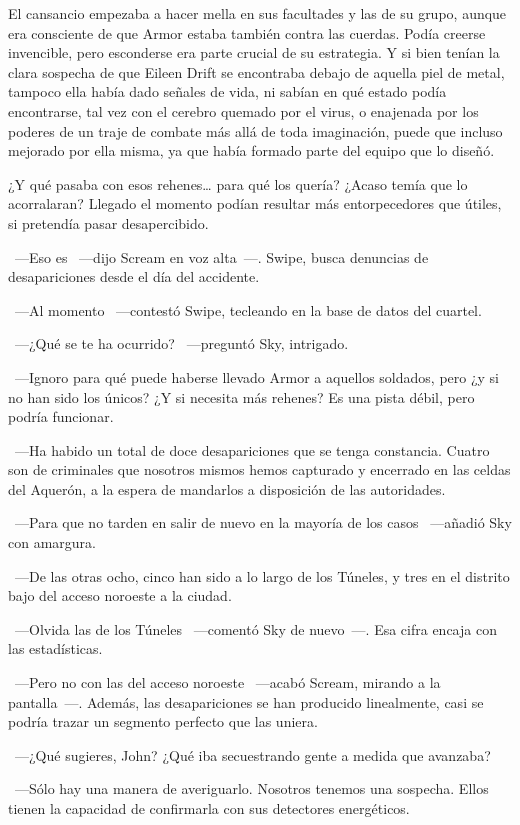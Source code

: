 El cansancio empezaba a hacer mella en sus facultades y las de su grupo, aunque era consciente de que Armor estaba también contra las cuerdas. Podía creerse invencible, pero esconderse era parte crucial de su estrategia. Y si bien tenían la clara sospecha de que Eileen Drift se encontraba debajo de aquella piel de metal, tampoco ella había dado señales de vida, ni sabían en qué estado podía encontrarse, tal vez con el cerebro quemado por el virus, o enajenada por los poderes de un traje de combate más allá de toda imaginación, puede que incluso mejorado por ella misma, ya que había formado parte del equipo que lo diseñó.

¿Y qué pasaba con esos rehenes\dots{} para qué los quería? ¿Acaso temía que lo acorralaran? Llegado el momento podían resultar más entorpecedores que útiles, si pretendía pasar desapercibido.

~---Eso es ~---dijo Scream en voz alta~---. Swipe, busca denuncias de desapariciones desde el día del accidente.

~---Al momento ~---contestó Swipe, tecleando en la base de datos del cuartel.

~---¿Qué se te ha ocurrido? ~---preguntó Sky, intrigado.

~---Ignoro para qué puede haberse llevado Armor a aquellos soldados, pero ¿y si no han sido los únicos? ¿Y si necesita más rehenes? Es una pista débil, pero podría funcionar.

~---Ha habido un total de doce desapariciones que se tenga constancia. Cuatro son de criminales que nosotros mismos hemos capturado y encerrado en las celdas del Aquerón, a la espera de mandarlos a disposición de las autoridades.

~---Para que no tarden en salir de nuevo en la mayoría de los casos ~---añadió Sky con amargura.

~---De las otras ocho, cinco han sido a lo largo de los Túneles, y tres en el distrito bajo del acceso noroeste a la ciudad.

~---Olvida las de los Túneles ~---comentó Sky de nuevo~---. Esa cifra encaja con las estadísticas.

~---Pero no con las del acceso noroeste ~---acabó Scream, mirando a la pantalla~---. Además, las desapariciones se han producido linealmente, casi se podría trazar un segmento perfecto que las uniera.

~---¿Qué sugieres, John? ¿Qué iba secuestrando gente a medida que avanzaba?

~---Sólo hay una manera de averiguarlo. Nosotros tenemos una sospecha. Ellos tienen la capacidad de confirmarla con sus detectores energéticos.

